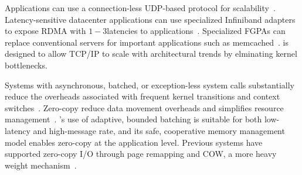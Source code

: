 Applications can use a connection-less UDP-based protocol for
scalability~\cite{nishtala2013scaling}.  Latency-sensitive datacenter
applications can use specialized Infiniband adapters to expose RDMA
with $1-3$\microsecond latencies to
applications~\cite{DBLP:conf/sosp/OngaroRSOR11,Jose:2011:MDH,mitchell:rdma,dragojevic14farm}.
Specialized FGPAs can replace conventional servers for important
applications such as
memcached~\cite{DBLP:conf/fpga/ChalamalasettiLWARM13}.  \ix is
designed to allow TCP/IP to scale with architectural trends by
elminating kernel bottlenecks.


Systems with asynchronous, batched, or exception-less system calls
substantially reduce the overheads associated with frequent kernel
transitions and context switches~\cite{
  soares2010flexsc,han2012megapipe,rizzo2012netmap,jeong2014mtcp}.
Zero-copy reduce data movement overheads and simplifies resource
management~\cite{DBLP:journals/tocs/PaiDZ00}.  \ix's use of adaptive,
bounded batching is suitable for both low-latency and high-message
rate, and its safe, cooperative memory management model enables
zero-copy at the application level. Previous systems have supported
zero-copy I/O through page remapping and COW, a more heavy weight mechanism~\cite{solaris_zc}.


